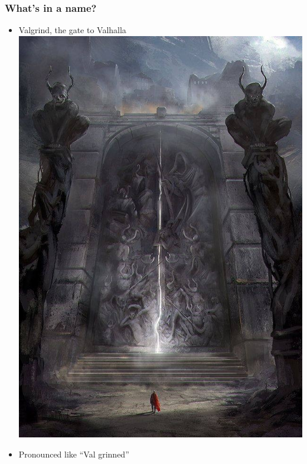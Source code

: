 \documentclass{beamer}
\begin{document}
\begin{frame}[fragile]
\frametitle{What's in a name?}
\begin{itemize}
\item Valgrind, the gate to Valhalla \\
\includegraphics[height=0.3\textheight]{gate.jpg} 
\item Pronounced like ``Val grinned'' \\

\end{itemize}
\end{frame}
\end{document}
